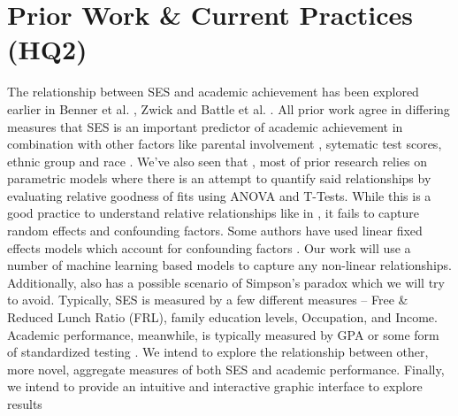 \documentclass[sigconf,nonacm,11pt]{acmart}
\begin{document}
\section{Prior Work \& Current Practices (HQ2)}

The relationship between SES and academic achievement has been explored earlier in Benner et al. \cite{parentalinvolvement}, Zwick \cite{collegescores} and Battle et al. \cite{raceses}. All prior work agree in differing measures that SES is an important predictor of academic achievement in combination with other factors like parental involvement \cite{parentalinvolvement}, sytematic test scores, ethnic group \cite{collegescores} and race \cite{raceses}. We've also seen that \cite{parentalinvolvement, collegescores, raceses, farooq}, most of prior research relies on parametric models where there is an attempt to quantify said relationships by evaluating relative goodness of fits using ANOVA and T-Tests. While this is a good practice to understand relative relationships like in \cite{collegescores, raceses}, it fails to capture random effects and confounding factors. Some authors have used linear fixed effects models which account for confounding factors \cite{winters, jinnai}. Our work will use a number of machine learning based models to capture any non-linear relationships. Additionally, \cite{collegescores} also has a possible scenario of Simpson's paradox which we will try to avoid. Typically, \cite{sirin} SES is measured by a few different measures -- Free \& Reduced Lunch Ratio (FRL), family education levels, Occupation, and Income.  Academic performance, meanwhile, is typically measured by GPA or some form of standardized testing \cite{sirin}.  We intend to explore the relationship between other, more novel, aggregate measures of both SES and academic performance. Finally, we intend to provide an intuitive and interactive graphic interface to explore results
\end{document}
